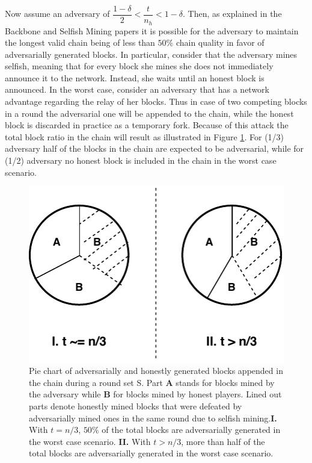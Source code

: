 Now assume an adversary of $ \dfrac{1-\delta}{2} < \dfrac{t}{n_h} < 1-\delta $. Then, as explained
in the Backbone and Selfish Mining papers \cite{backbone}\cite{selfish} it
is possible for the adversary to maintain the longest valid chain being of less
than $50\%$ chain quality in favor of adversarially generated blocks. In particular,
consider that the adversary mines selfish, meaning that for every block she mines
she does not immediately announce it to the network. Instead, she waits until an
honest block is announced. In the worst case, consider an adversary that has a
network advantage regarding the relay of her blocks. Thus in case of two competing
blocks in a round the adversarial one will be appended to the chain, while the
honest block is discarded in practice as a temporary fork. Because of this attack
the total block ratio in the chain will result as illustrated in Figure
\ref{fig:selfish_mining_pie}. For (1/3) adversary half of the blocks in the
chain are expected to be adversarial, while for (1/2) adversary no honest block
is included in the chain in the worst case scenario.

\begin{figure}[h!]
	\begin{center}
		\includegraphics[scale=0.8]{figures/selfish_mining_pie.pdf}
	\end{center}
	\caption{Pie chart of adversarially and honestly generated blocks appended in 
	the chain during a round set S. Part \textbf{A} stands for blocks mined by the
	adversary while \textbf{B} for blocks mined by honest players. Lined out parts
	denote honestly mined blocks that were defeated by adversarially mined ones in
	the same round due to selfish mining.\textbf{I.} With $t = n/3$, $50\%$ of the
	total blocks are adversarially generated in the worst case scenario. \textbf{II.}
	With $t > n/3$, more than half of the total blocks are adversarially generated in
	the worst case scenario.}
	\label{fig:selfish_mining_pie}
\end{figure}

